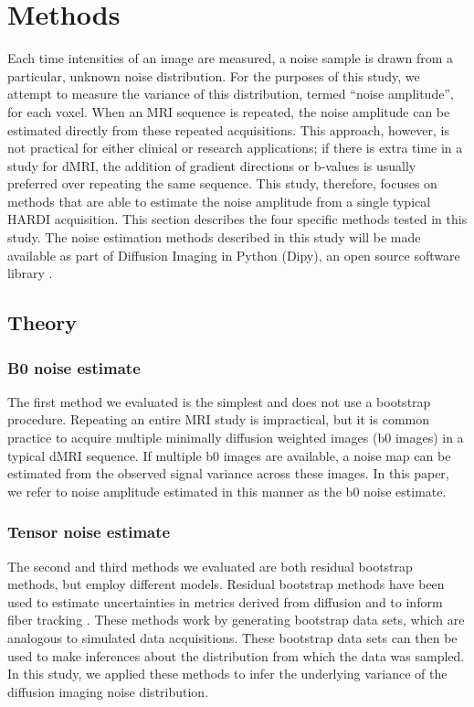 \section{Methods}

Each time intensities of an image are measured, a noise sample is drawn
from a particular, unknown noise distribution. For the purposes of this
study, we attempt to measure the variance of this distribution, termed
``noise amplitude'', for each voxel. When an MRI sequence is repeated,
the noise amplitude can be estimated directly from these repeated
acquisitions. This approach, however, is not practical for either
clinical or research applications; if there is extra time in a study for
dMRI, the addition of gradient directions or b-values is usually
preferred over repeating the same sequence. This study, therefore,
focuses on methods that are able to estimate the noise amplitude from a
single typical HARDI acquisition. This section describes the four
specific methods tested in this study. The noise estimation methods
described in this study will be made available as part of Diffusion
Imaging in Python (Dipy), an open source software library \cite{Garyfallidis_2014}.

\subsection{Theory}
\subsubsection{B0 noise estimate}

The first method we evaluated is the simplest and does not use a
bootstrap procedure. Repeating an entire MRI study is impractical, but
it is common practice to acquire multiple minimally diffusion weighted
images (b0 images) in a typical dMRI sequence. If multiple b0 images are
available, a noise map can be estimated from the observed signal
variance across these images. In this paper, we refer to noise amplitude
estimated in this manner as the b0 noise estimate.

\subsubsection{Tensor noise estimate}

The second and third methods we evaluated are both residual bootstrap
methods, but employ different models. Residual bootstrap methods have
been used to estimate uncertainties in metrics derived from diffusion \cite{Chung_2006, Haroon_2009} and to inform fiber tracking \cite{17911030}. These methods work by generating bootstrap data sets, which are
analogous to simulated data acquisitions. These bootstrap data sets can
then be used to make inferences about the distribution from which the
data was sampled. In this study, we applied these methods to infer the
underlying variance of the diffusion imaging noise distribution.

